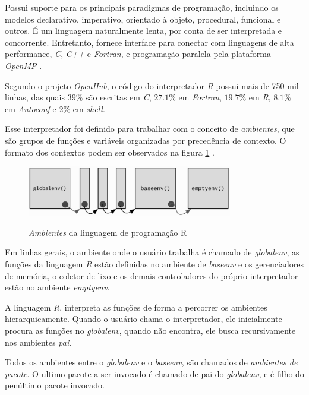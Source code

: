 Possui suporte para os principais paradigmas de programação, incluindo os modelos  declarativo, imperativo, orientado à objeto, procedural, funcional e outros. É um linguagem naturalmente lenta, por conta de ser interpretada e concorrente. Entretanto, fornece interface para conectar com linguagens de alta performance, \textit{C}, \textit{C++} e \textit{Fortran}, e programação paralela pela plataforma \textit{OpenMP} .

Segundo o projeto \textit{OpenHub}, o código do interpretador \textit{R} possui mais de 750 mil linhas, das quais $39\%$ são escritas em \textit{C}, $27.1\%$ em \textit{Fortran}, $19.7\%$ em \textit{R}, $8.1\%$ em \textit{Autoconf} e $2\%$ em \textit{shell}. 

Esse interpretador foi definido para trabalhar com o conceito de \textit{ambientes}, que são grupos de funções e variáveis organizadas por precedência de contexto. O formato dos contextos podem ser observados na figura \ref{fig:R_Envs} .

\begin{figure}[!htb]
	\centering
	\caption{\textit{Ambientes} da linguagem de programação R}
	\includegraphics[width=0.8\textwidth]{./04-figuras/R-envs}
	\label{fig:R_Envs}
\end{figure}

Em linhas gerais, o ambiente onde o usuário trabalha é chamado de \textit{globalenv}, as funções da linguagem \textit{R} estão definidas no ambiente de \textit{baseenv} e os gerenciadores de memória, o coletor de lixo e os demais controladores do próprio interpretador estão no ambiente \textit{emptyenv}.

A linguagem \textit{R}, interpreta as funções de forma a percorrer os ambientes hierarquicamente. Quando o usuário chama o interpretador, ele inicialmente procura as funções no \textit{globalenv}, quando não encontra, ele busca recursivamente nos ambientes \textit{pai}.

Todos os ambientes entre o \textit{globalenv} e o \textit{baseenv}, são chamados de \textit{ambientes de pacote}. 
O ultimo pacote a ser invocado é chamado de pai do \textit{globalenv}, e é filho do penúltimo pacote invocado. 

